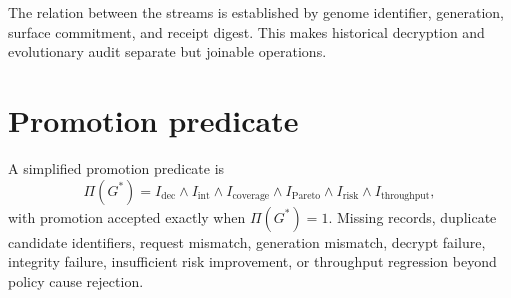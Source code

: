 The relation between the streams is established by genome identifier, generation, surface commitment, and receipt digest. This makes historical decryption and evolutionary audit separate but joinable operations.

\section{Promotion predicate}
A simplified promotion predicate is
\begin{equation}
\Pi(G^*)=I_{\mathrm{dec}}\land I_{\mathrm{int}}\land I_{\mathrm{coverage}}\land I_{\mathrm{Pareto}}\land I_{\mathrm{risk}}\land I_{\mathrm{throughput}},
\end{equation}
with promotion accepted exactly when $\Pi(G^*)=1$. Missing records, duplicate candidate identifiers, request mismatch, generation mismatch, decrypt failure, integrity failure, insufficient risk improvement, or throughput regression beyond policy cause rejection.